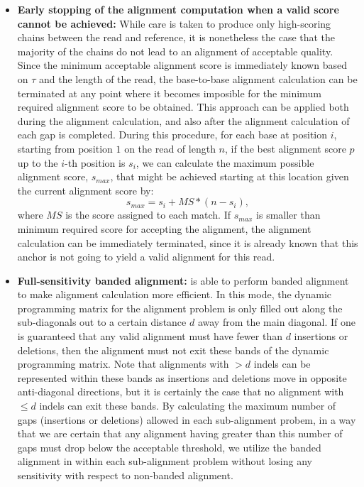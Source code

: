 \begin{itemize}
    \item \textbf{Early stopping of the alignment computation when a valid score cannot be achieved:} While care is taken to produce only high-scoring chains between the read and reference, it is nonetheless the case that the majority of the chains do not lead to an alignment of acceptable quality. Since the minimum acceptable alignment score is immediately known based on $\tau$ and the length of the read, the base-to-base alignment calculation can be terminated at any point where it becomes imposible for the minimum required alignment score to be obtained. This approach can be applied both during the \ksw alignment calculation, and also after the alignment calculation of each gap is completed. During this procedure, for each base at position $i$, starting from position $1$ on the read of length $n$, if the best alignment score $p$ up to the $i$-th position is $s_i$, we can calculate the maximum possible alignment score, $s_{max}$, that might be achieved starting at this location given the current alignment score by:
    \begin{equation}
        s_{max} = s_i + MS * (n - s_i),
    \end{equation}
    where $MS$ is the score assigned to each match. If $s_{max}$ is smaller than minimum required score for accepting the alignment, the alignment calculation can be immediately terminated, since it is already known that this anchor is not going to yield a valid alignment for this read.

    \item \textbf{Full-sensitivity banded alignment:} \ksw is able to perform banded 
    alignment to make alignment calculation more efficient. In this mode, the dynamic 
    programming matrix for the alignment problem is only filled out along the sub-diagonals 
    out to a certain distance $d$ away from the main diagonal. If one is guaranteed that any 
    valid alignment must have fewer than $d$ insertions or deletions, then the alignment must 
    not exit these bands of the dynamic programming matrix.  Note that alignments with 
    $> d$ indels can be represented within these bands as insertions and deletions move 
    in opposite anti-diagonal directions, but it is certainly the case that no alignment
    with $\le d$ indels can exit these bands. By calculating the maximum number of gaps 
    (insertions or deletions) allowed in each sub-alignment probem, in a way that we are 
    certain that any alignment having greater than this number of gaps must drop below 
    the acceptable threshold, we utilize the banded alignment in \ksw within each 
    sub-alignment problem without losing any sensitivity with respect to non-banded alignment.
\end{itemize}

